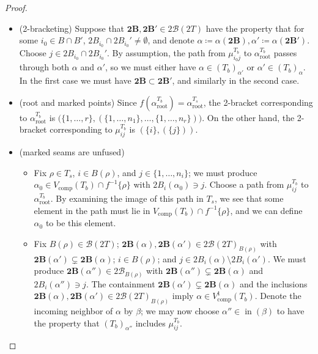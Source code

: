 \documentclass[11pt]{amsart}
\theoremstyle{definition}
\theoremstyle{remark}
\theoremstyle{plain}
\newcommand{\btB}{{\mathbf{2B}}}
\newcommand{\sB}{\mathscr{B}}
\newcommand{\stB}{2\mathscr{B}}
\newcommand{\on}{\operatorname}
\newcommand{\comp}{C^2}
\renewcommand{\comp}{{\on{comp}}}
\newcommand{\incom}{\on{in}}
\renewcommand{\root}{{\on{root}}}
\begin{document}
\begin{proof}
\begin{itemize}
\medskip

\item[] {\sc(2-bracketing)} Suppose that $\btB, \btB' \in \stB(2T)$ have the property that for some $i_0 \in B \cap B'$, $2B_{i_0} \cap 2B_{i_0}' \neq \emptyset$, and denote $\alpha \coloneqq \alpha(\btB), \alpha' \coloneqq \alpha(\btB')$.
Choose $j \in 2B_{i_0} \cap 2B_{i_0}'$.
By assumption, the path from $\mu_{i_0j}^{T_b}$ to $\alpha_\root^{T_b}$ passes through both $\alpha$ and $\alpha'$, so we must either have $\alpha \in (T_b)_{\alpha'}$ or $\alpha' \in (T_b)_\alpha$.
In the first case we must have $\btB \subset \btB'$, and similarly in the second case.

\medskip

\item[] {\sc(root and marked points)} Since $f(\alpha_\root^{T_b}) = \alpha_\root^{T_s}$, the 2-bracket corresponding to $\alpha_\root^{T_b}$ is $\bigl(\{1,\ldots,r\},(\{1,\ldots,n_1\},\ldots,\{1,\ldots,n_r\})\bigr)$.
On the other hand, the 2-bracket corresponding to $\mu_{ij}^{T_b}$ is $(\{i\},(\{j\}))$.

\medskip

\item[] {\sc(marked seams are unfused)}
\begin{itemize}
\item Fix $\rho \in T_s$, $i \in B(\rho)$, and $j \in \{1,\ldots,n_i\}$; we must produce $\alpha_0 \in V_\comp(T_b) \cap f^{-1}\{\rho\}$ with $2B_i(\alpha_0) \ni j$.
Choose a path from $\mu^{T_b}_{ij}$ to $\alpha_\root^{T_b}$.
By examining the image of this path in $T_s$, we see that some element in the path must lie in $V_\comp(T_b)\cap f^{-1}\{\rho\}$, and we can define $\alpha_0$ to be this element.

\item Fix $B(\rho) \in \sB(2T)$; $\btB(\alpha), \btB(\alpha') \in \stB(2T)_{B(\rho)}$ with $\btB(\alpha') \subsetneq \btB(\alpha)$; $i \in B(\rho)$; and $j \in 2B_i(\alpha) \setminus 2B_i(\alpha')$.
We must produce $\btB(\alpha'') \in \stB_{B(\rho)}$ with $\btB(\alpha'') \subsetneq \btB(\alpha)$ and $2B_i(\alpha'') \ni j$.
The containment $\btB(\alpha') \subsetneq \btB(\alpha)$ and the inclusions $\btB(\alpha),\btB(\alpha') \in \stB(2T)_{B(\rho)}$ imply $\alpha \in V_\comp^1(T_b)$.
Denote the incoming neighbor of $\alpha$ by $\beta$; we may now choose $\alpha'' \in \incom(\beta)$ to have the property that $(T_b)_{\alpha''}$ includes $\mu_{ij}^{T_b}$.
\end{itemize}


\end{itemize}
\end{proof}
\end{document}
